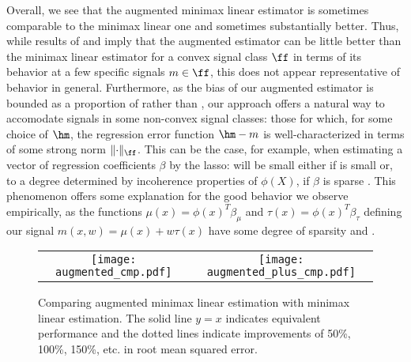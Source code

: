 \documentclass[aos,submission]{imsart}
\theoremstyle{plain}
\theoremstyle{remark}
\DeclarePairedDelimiter\norm{\lVert}{\rVert}
\begin{document}
Overall, we see that the augmented minimax linear estimator is sometimes comparable to the
minimax linear one and sometimes substantially better. Thus, while results of \citet{donoho1994statistical} and \citet{armstrong2015optimal} 
imply that the augmented estimator can be little better than the minimax linear estimator for a convex signal class $\ff$ 
in terms of its behavior at a few specific signals $m \in \ff$,
this does not appear representative of behavior in general.
Furthermore, as the bias of our augmented estimator is bounded as a proportion of 
rather than , our approach offers a natural way to accomodate signals in some non-convex signal classes: 
those for which, for some choice of $\hm$, the regression error function $\hm - m$ is well-characterized in terms of some strong norm $\norm{\cdot}_{\ff}$.
This can be the case, for example, when estimating a vector of regression coefficients $\beta$ by the lasso: 
 will be small
either if  is small or,
to a degree determined by incoherence properties of $\phi(X)$, if $\beta$ is sparse \citep[e.g.][]{lecue2018regularization}.
This phenomenon offers some explanation for the good behavior we observe empirically, as 
the functions $\mu(x)=\phi(x)^T \beta_{\mu}$ and $\tau(x) = \phi(x)^T \beta_{\tau}$ defining our signal $m(x,w)=\mu(x)+w\tau(x)$ have some degree of sparsity 
and . 


\begin{figure}[t]
\begin{center}
\begin{tabular}{cc}
\texttt{[image: augmented\_cmp.pdf]} &
\texttt{[image: augmented\_plus\_cmp.pdf]}
\end{tabular}
\caption[Comparing augmented minimax linear estimation with linear estimation.]{Comparing augmented minimax linear estimation with minimax linear estimation.
The solid line $y=x$ indicates equivalent performance and the dotted lines indicate improvements of 50\%, 100\%, 150\%, etc. in root mean squared error.}
\label{fig:augment}
\end{center}
\end{figure}
\end{document}

